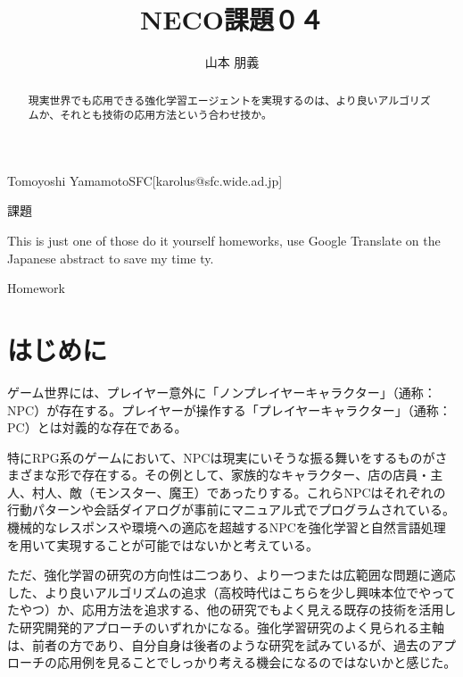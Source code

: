 \documentclass[submit,uplatex]{ipsj}
\begin{document}
\title{NECO課題０４}


\author{山本 朋義}{Tomoyoshi Yamamoto}{SFC}[karolus@sfc.wide.ad.jp]

\begin{abstract}
現実世界でも応用できる強化学習エージェントを実現するのは、より良いアルゴリズムか、それとも技術の応用方法という合わせ技か。
\end{abstract}


\begin{jkeyword}
課題
\end{jkeyword}

\begin{eabstract}
This is just one of those do it yourself homeworks, use Google Translate on the Japanese abstract to save my time ty.
\end{eabstract}

\begin{ekeyword}
Homework
\end{ekeyword}

\maketitle

\section{はじめに}

ゲーム世界には、プレイヤー意外に「ノンプレイヤーキャラクター」（通称：NPC）が存在する。プレイヤーが操作する「プレイヤーキャラクター」（通称：PC）とは対義的な存在である。

特にRPG系のゲームにおいて、NPCは現実にいそうな振る舞いをするものがさまざまな形で存在する。その例として、家族的なキャラクター、店の店員・主人、村人、敵（モンスター、魔王）であったりする。これらNPCはそれぞれの行動パターンや会話ダイアログが事前にマニュアル式でプログラムされている。機械的なレスポンスや環境への適応を超越するNPCを強化学習と自然言語処理を用いて実現することが可能ではないかと考えている。

ただ、強化学習の研究の方向性は二つあり、より一つまたは広範囲な問題に適応した、より良いアルゴリズムの追求（高校時代はこちらを少し興味本位でやってたやつ）か、応用方法を追求する、他の研究でもよく見える既存の技術を活用した研究開発的アプローチのいずれかになる。強化学習研究のよく見られる主軸は、前者の方であり、自分自身は後者のような研究を試みているが、過去のアプローチの応用例を見ることでしっかり考える機会になるのではないかと感じた。
\end{document}
